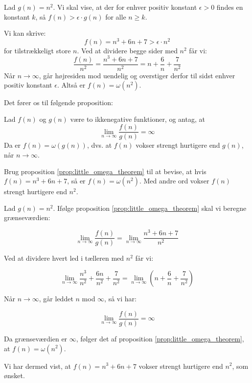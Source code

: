 \begin{solution}
    Lad $g(n) = n^2$. Vi skal vise, at der for enhver positiv konstant $\epsilon > 0$ findes en konstant $k$, så $f(n) > \epsilon \cdot g(n)$ for alle $n \geq k$.

    Vi kan skrive:
    \[
    f(n) = n^3 + 6n + 7 > \epsilon \cdot n^2
    \]
    for tilstrækkeligt store $n$. Ved at dividere begge sider med $n^2$ får vi:
    \[
    \frac{f(n)}{n^2} = \frac{n^3 + 6n + 7}{n^2} = n + \frac{6}{n} + \frac{7}{n^2}
    \]
    Når $n \to \infty$, går højresiden mod uendelig og overstiger derfor til sidst enhver positiv konstant $\epsilon$. Altså er $f(n) = \omega(n^2)$.
\end{solution}

Det fører os til følgende proposition:

\begin{proposition} \label{prop:little_omega_theorem}
    Lad \( f(n) \) og \( g(n) \) være to ikkenegative funktioner, og antag, at
    \medskip
    \[
    \lim_{n \rightarrow \infty} \frac{f(n)}{g(n)} = \infty
    \]
    \medskip
    Da er \( f(n) = \omega(g(n)) \), dvs. at \( f(n) \) vokser strengt hurtigere end \( g(n) \), når \( n \to \infty \).
\end{proposition}

\begin{example}
    Brug proposition \ref{prop:little_omega_theorem} til at bevise, at hvis \( f(n) = n^3 + 6n + 7 \), så er \( f(n) = \omega(n^2) \). Med andre ord vokser \( f(n) \) strengt hurtigere end \( n^2 \).
\end{example}

\begin{solution}
    Lad \( g(n) = n^2 \). Ifølge proposition \ref{prop:little_omega_theorem} skal vi beregne grænseværdien:
    
    \[
    \lim_{n \to \infty} \frac{f(n)}{g(n)} = \lim_{n \to \infty} \frac{n^3 + 6n + 7}{n^2}
    \]
    
    Ved at dividere hvert led i tælleren med \( n^2 \) får vi:
    
    \[
    \lim_{n \to \infty} \frac{n^3}{n^2} + \frac{6n}{n^2} + \frac{7}{n^2} = \lim_{n \to \infty} \left( n + \frac{6}{n} + \frac{7}{n^2} \right)
    \]
    
    Når \( n \to \infty \), går leddet \( n \) mod \( \infty \), så vi har:
    
    \[
    \lim_{n \to \infty} \frac{f(n)}{g(n)} = \infty
    \]
    
    Da grænseværdien er \( \infty \), følger det af proposition \ref{prop:little_omega_theorem}, at \( f(n) = \omega(n^2) \).
    
    Vi har dermed vist, at \( f(n) = n^3 + 6n + 7 \) vokser strengt hurtigere end \( n^2 \), som ønsket.
\end{solution}

